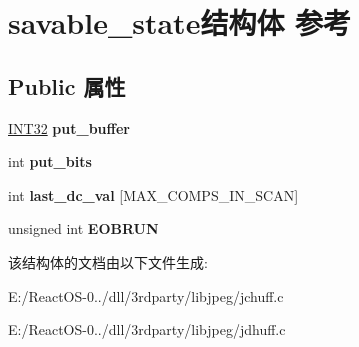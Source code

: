 \hypertarget{structsavable__state}{}\section{savable\+\_\+state结构体 参考}
\label{structsavable__state}
\subsection*{Public 属性}
\begin{DoxyCompactItemize}
\item 
\mbox{\label{structsavable__state_a71fdab6bc3ab791e85f61179045da4dd}} 
\hyperlink{_processor_bind_8h_a1137216524060afd426c34677fed058b}{I\+N\+T32} {\bfseries put\+\_\+buffer}
\item 
\mbox{\label{structsavable__state_a767d7a21d1bd5bee01108b947bfc9fbf}} 
int {\bfseries put\+\_\+bits}
\item 
\mbox{\label{structsavable__state_a828b78727611f4ff5353d24cf7230d85}} 
int {\bfseries last\+\_\+dc\+\_\+val} \mbox{[}M\+A\+X\+\_\+\+C\+O\+M\+P\+S\+\_\+\+I\+N\+\_\+\+S\+C\+AN\mbox{]}
\item 
\mbox{\label{structsavable__state_a23c64b6c9ba0c84041e1a0533c2312cb}} 
unsigned int {\bfseries E\+O\+B\+R\+UN}
\end{DoxyCompactItemize}


该结构体的文档由以下文件生成\+:\begin{DoxyCompactItemize}
\item 
E\+:/\+React\+O\+S-\/0../dll/3rdparty/libjpeg/jchuff.\+c\item 
E\+:/\+React\+O\+S-\/0../dll/3rdparty/libjpeg/jdhuff.\+c\end{DoxyCompactItemize}

